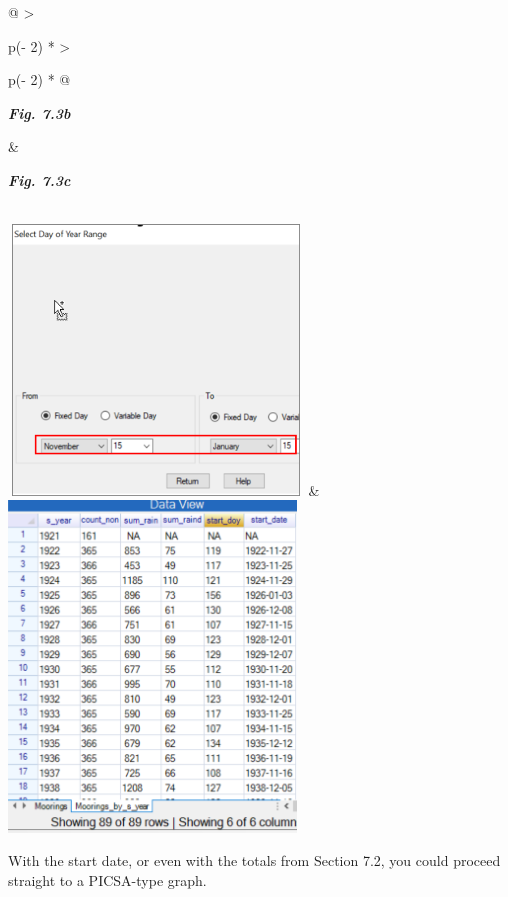 \documentclass[
  letterpaper,
  DIV=11,
  numbers=noendperiod]{scrreprt}
\begin{document}
\begin{longtable}[]{@{}
  >{\raggedright\arraybackslash}p{(\columnwidth - 2\tabcolsep) * }
  >{\raggedright\arraybackslash}p{(\columnwidth - 2\tabcolsep) * }@{}}
\toprule\noalign{}
\begin{minipage}[b]{\linewidth}\raggedright
\textbf{\emph{Fig. 7.3b}}
\end{minipage} & \begin{minipage}[b]{\linewidth}\raggedright
\textbf{\emph{Fig. 7.3c}}
\end{minipage} \\
\midrule\noalign{}
\endhead
\bottomrule\noalign{}
\endlastfoot
\includegraphics[width=3.08141in,height=2.82925in]{figures/Fig7.3b.png}
&
\includegraphics[width=3.01452in,height=3.4613in]{figures/Fig7.3c.png} \\
\end{longtable}

With the start date, or even with the totals from Section 7.2, you could
proceed straight to a PICSA-type graph.
\end{document}
